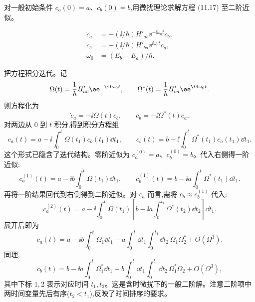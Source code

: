 \begin{question}
对一般初始条件 $c_a(0)=a$、$c_b(0)=b$,用微扰理论求解方程 (11.17) 至二阶近似。

\par\smallskip
{}\[
\begin{aligned}\dot c_a&=-(\ii/\hbar)H'_{ab}\ee^{-\ii\omega_0t}c_b,\\\dot c_b&=-(\ii/\hbar)H'_{ba}\ee^{\ii\omega_0t}c_a,\\\omega_0&=(E_b-E_a)/\hbar.\end{aligned}\]

\begin{solution}
把方程积分迭代。记
\[
\Omega(t)={1\over\hbar}H'_{ab}\ee^{-\ii\omega_0t},
\qquad
\Omega^*(t)={1\over\hbar}H'_{ba}\ee^{\ii\omega_0t}.
\]
则方程化为
\[
\dot c_a=-\ii\Omega(t)c_b,\qquad
\dot c_b=-\ii\Omega^*(t)c_a.
\]
对两边从 $0$ 到 $t$ 积分,得到积分方程组
\[
c_a(t)=a-\ii\int_0^t\Omega(t_1)c_b(t_1)\dd t_1,
\qquad
c_b(t)=b-\ii\int_0^t\Omega^*(t_1)c_a(t_1)\dd t_1.
\]
这个形式已隐含了迭代结构。零阶近似为 $c_a^{(0)}=a$、$c_b^{(0)}=b$。代入右侧得一阶近似:
\[
c_a^{(1)}(t)=a-\ii b\int_0^t\Omega(t_1)\dd t_1,
\qquad
c_b^{(1)}(t)=b-\ii a\int_0^t\Omega^*(t_1)\dd t_1.
\]
再将一阶结果回代到右侧得到二阶近似。对 $c_a$ 而言,需将 $c_b\approx c_b^{(1)}$ 代入:
\[
c_a^{(2)}(t)=a-\ii\int_0^t\Omega(t_1)\left[b-\ii a\int_0^{t_1}\Omega^*(t_2)\dd t_2\right]\dd t_1.
\]
展开后即为
\[
c_a(t)=a-\ii b\int_0^t\Omega_1\dd t_1
-a\int_0^t\dd t_1\int_0^{t_1}\dd t_2\,\Omega_1\Omega_2^*+O(\Omega^3).
\]
同理,
\[
c_b(t)=b-\ii a\int_0^t\Omega_1^*\dd t_1
-b\int_0^t\dd t_1\int_0^{t_1}\dd t_2\,\Omega_1^*\Omega_2+O(\Omega^3),
\]
其中下标 $1,2$ 表示对应时间 $t_1,t_2$。这是含时微扰下的一般二阶解。注意二阶项中两时间变量先后有序($t_2<t_1$),反映了时间排序的要求。
\end{solution}
\end{question}

